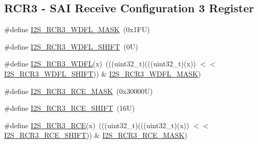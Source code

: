 \subsection*{R\+C\+R3 -\/ S\+AI Receive Configuration 3 Register}
\begin{DoxyCompactItemize}
\item 
\#define \mbox{\hyperlink{group___i2_s___register___masks_gab98b46b5057b2fd18a0fefb93eb20450}{I2\+S\+\_\+\+R\+C\+R3\+\_\+\+W\+D\+F\+L\+\_\+\+M\+A\+SK}}~(0x1\+F\+U)
\item 
\#define \mbox{\hyperlink{group___i2_s___register___masks_gaab28291891b0e5ced36d580cef82982d}{I2\+S\+\_\+\+R\+C\+R3\+\_\+\+W\+D\+F\+L\+\_\+\+S\+H\+I\+FT}}~(0\+U)
\item 
\#define \mbox{\hyperlink{group___i2_s___register___masks_ga18826ab90db71ce827a4ad913cf66387}{I2\+S\+\_\+\+R\+C\+R3\+\_\+\+W\+D\+FL}}(x)~(((uint32\+\_\+t)(((uint32\+\_\+t)(x)) $<$$<$ \mbox{\hyperlink{group___i2_s___register___masks_gaab28291891b0e5ced36d580cef82982d}{I2\+S\+\_\+\+R\+C\+R3\+\_\+\+W\+D\+F\+L\+\_\+\+S\+H\+I\+FT}})) \& \mbox{\hyperlink{group___i2_s___register___masks_gab98b46b5057b2fd18a0fefb93eb20450}{I2\+S\+\_\+\+R\+C\+R3\+\_\+\+W\+D\+F\+L\+\_\+\+M\+A\+SK}})
\item 
\#define \mbox{\hyperlink{group___i2_s___register___masks_ga1609ba1986cd2320ff34a1308599c93b}{I2\+S\+\_\+\+R\+C\+R3\+\_\+\+R\+C\+E\+\_\+\+M\+A\+SK}}~(0x30000\+U)
\item 
\#define \mbox{\hyperlink{group___i2_s___register___masks_ga1ed5dcaaac88cd06cfc10bb290c7f097}{I2\+S\+\_\+\+R\+C\+R3\+\_\+\+R\+C\+E\+\_\+\+S\+H\+I\+FT}}~(16\+U)
\item 
\#define \mbox{\hyperlink{group___i2_s___register___masks_ga7bdf74b0c7537c65dfdb73ef6f966e92}{I2\+S\+\_\+\+R\+C\+R3\+\_\+\+R\+CE}}(x)~(((uint32\+\_\+t)(((uint32\+\_\+t)(x)) $<$$<$ \mbox{\hyperlink{group___i2_s___register___masks_ga1ed5dcaaac88cd06cfc10bb290c7f097}{I2\+S\+\_\+\+R\+C\+R3\+\_\+\+R\+C\+E\+\_\+\+S\+H\+I\+FT}})) \& \mbox{\hyperlink{group___i2_s___register___masks_ga1609ba1986cd2320ff34a1308599c93b}{I2\+S\+\_\+\+R\+C\+R3\+\_\+\+R\+C\+E\+\_\+\+M\+A\+SK}})
\end{DoxyCompactItemize}
